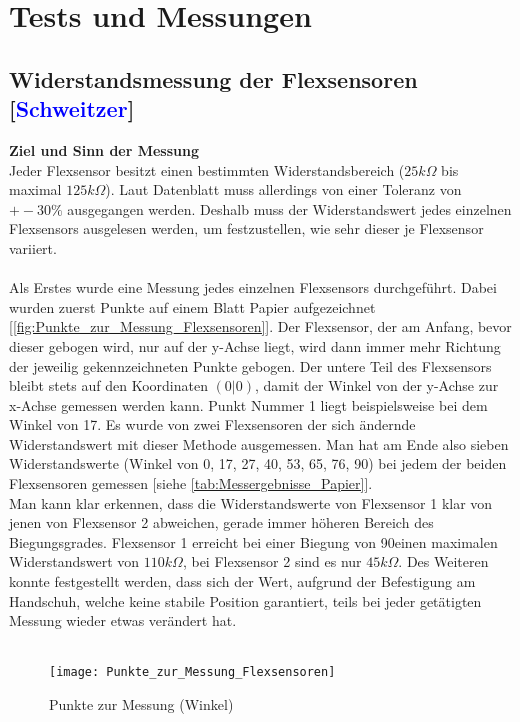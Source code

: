 \documentclass[titlepage,12pt,twoside]{article}
\begin{document}
\newpage
\section{Tests und Messungen}
\subsection{Widerstandsmessung der Flexsensoren [\textcolor{blue}{Schweitzer}]}
\textbf{Ziel und Sinn der Messung} \\
Jeder Flexsensor besitzt einen bestimmten Widerstandsbereich ($25k\Omega$ bis maximal $125k\Omega$). Laut Datenblatt muss allerdings von einer Toleranz von $+-30\%$ ausgegangen 
werden. Deshalb muss der Widerstandswert jedes einzelnen Flexsensors ausgelesen werden, um festzustellen, wie sehr dieser je Flexsensor variiert. \\
\\
Als Erstes wurde eine Messung jedes einzelnen Flexsensors durchgeführt. Dabei wurden zuerst Punkte auf einem Blatt Papier aufgezeichnet [\textcolor{blue}{\autoref{fig:Punkte_zur_Messung_Flexsensoren}}]. 
Der Flexsensor, der am Anfang, bevor dieser gebogen wird, nur auf der y-Achse liegt, wird dann immer mehr Richtung der jeweilig gekennzeichneten Punkte gebogen. 
Der untere Teil des Flexsensors bleibt stets auf den Koordinaten $(0|0)$, damit der Winkel von der y-Achse zur x-Achse gemessen werden kann. Punkt Nummer 1 liegt 
beispielsweise bei dem Winkel von 17\textdegree. Es wurde von zwei Flexsensoren der sich ändernde Widerstandswert mit dieser Methode ausgemessen. Man hat am Ende also sieben 
Widerstandswerte (Winkel von 0\textdegree, 17\textdegree, 27\textdegree, 40\textdegree, 53\textdegree, 65\textdegree, 76\textdegree, 90\textdegree) bei jedem der beiden Flexsensoren gemessen [siehe \textcolor{blue}{\autoref{tab:Messergebnisse_Papier}}]. \\
Man kann klar erkennen, dass die Widerstandswerte von Flexsensor 1 klar von jenen von Flexsensor 2 abweichen, gerade immer höheren Bereich des Biegungsgrades. 
Flexsensor 1 erreicht bei einer Biegung von 90\textdegree einen maximalen Widerstandswert von $110k\Omega$, bei Flexsensor 2 sind es nur $45k\Omega$. Des Weiteren konnte festgestellt 
werden, dass sich der Wert, aufgrund der Befestigung am Handschuh, welche keine stabile Position garantiert, teils bei jeder getätigten Messung wieder etwas verändert hat. \\
\\
\begin{figure}[H]
	\begin{center}
		\scalebox{1.0}
		{\texttt{[image: Punkte\_zur\_Messung\_Flexsensoren]}}
		\caption{Punkte zur Messung (Winkel)}
		\label{fig:Punkte_zur_Messung_Flexsensoren}				
	\end{center}
\end{figure}
\hfill \break
\end{document}
